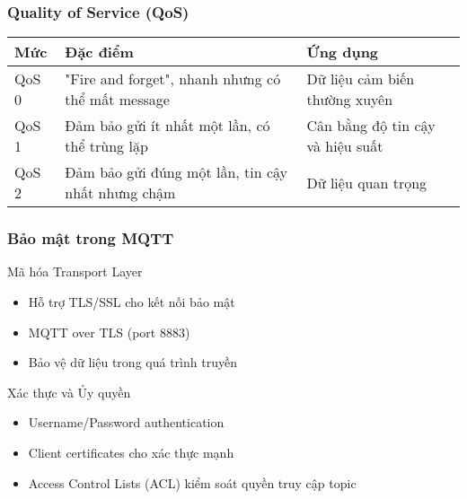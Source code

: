 \begin{frame}
\frametitle{Quality of Service (QoS)}

\begin{table}[h]
\centering
\begin{tabular}{lll}
\toprule
Mức & Đặc điểm & Ứng dụng \\
\midrule
QoS 0 & "Fire and forget", nhanh nhưng có thể mất message & Dữ liệu cảm biến thường xuyên \\
QoS 1 & Đảm bảo gửi ít nhất một lần, có thể trùng lặp & Cân bằng độ tin cậy và hiệu suất \\
QoS 2 & Đảm bảo gửi đúng một lần, tin cậy nhất nhưng chậm & Dữ liệu quan trọng \\
\bottomrule
\end{tabular}
\end{table}

\end{frame}

\begin{frame}
\frametitle{Bảo mật trong MQTT}

\begin{block}{Mã hóa Transport Layer}
\begin{itemize}
\item Hỗ trợ TLS/SSL cho kết nối bảo mật
\item MQTT over TLS (port 8883)
\item Bảo vệ dữ liệu trong quá trình truyền
\end{itemize}
\end{block}

\begin{block}{Xác thực và Ủy quyền}
\begin{itemize}
\item Username/Password authentication
\item Client certificates cho xác thực mạnh
\item Access Control Lists (ACL) kiểm soát quyền truy cập topic
\end{itemize}
\end{block}
\end{frame}

